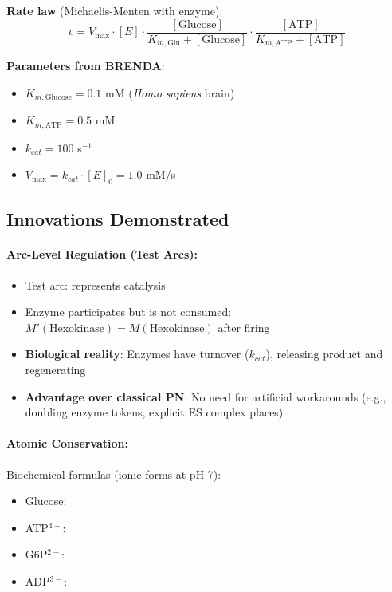 \textbf{Rate law} (Michaelis-Menten with enzyme):
\begin{equation}
v = V_{\max} \cdot [E] \cdot \frac{[\text{Glucose}]}{K_{m,\text{Glu}} + [\text{Glucose}]} \cdot \frac{[\text{ATP}]}{K_{m,\text{ATP}} + [\text{ATP}]}
\end{equation}

\textbf{Parameters from BRENDA}:
\begin{itemize}
    \item $K_{m,\text{Glucose}} = 0.1$ mM (\emph{Homo sapiens} brain)
    \item $K_{m,\text{ATP}} = 0.5$ mM
    \item $k_{cat} = 100$ s$^{-1}$
    \item $V_{\max} = k_{cat} \cdot [E]_0 = 1.0$ mM/s
\end{itemize}

\subsection{Innovations Demonstrated}
\label{subsec:hex-innovations}

\paragraph{Arc-Level Regulation (Test Arcs):}

\begin{itemize}
    \item Test arc:  represents catalysis
    \item Enzyme participates but is not consumed: $M'(\text{Hexokinase}) = M(\text{Hexokinase})$ after firing
    \item \textbf{Biological reality}: Enzymes have turnover ($k_{cat}$), releasing product and regenerating
    \item \textbf{Advantage over classical PN}: No need for artificial workarounds (e.g., doubling enzyme tokens, explicit ES complex places)
\end{itemize}

\paragraph{Atomic Conservation:}

Biochemical formulas (ionic forms at pH 7):
\begin{itemize}
    \item Glucose: 
    \item ATP$^{4-}$: 
    \item G6P$^{2-}$: 
    \item ADP$^{3-}$: 
\end{itemize}

